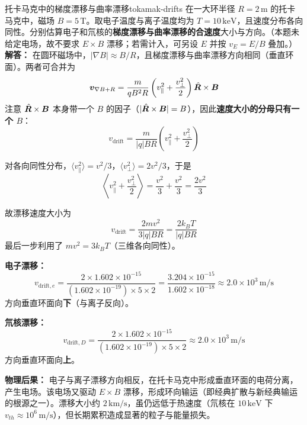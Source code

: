 \begin{example}{托卡马克中的梯度漂移与曲率漂移}{tokamak-drifts}
在一大环半径 $R=2\,\mathrm{m}$ 的托卡马克中，磁场 $B=5\,\mathrm{T}$。取电子温度与离子温度均为 $T=10\,\mathrm{keV}$，且速度分布各向同性。分别估算电子和氘核的\textbf{梯度漂移与曲率漂移的合速度}大小与方向。（本题未给定电场，故不要求 $E\times B$ 漂移；若需计入，可另设 $E$ 并按 $v_E=E/B$ 叠加。）
\tcblower
\textbf{解答：}
在圆环磁场中，$|\nabla B|\approx B/R$，且梯度漂移与曲率漂移方向相同（垂直环面）。两者可合并为
\[
\bm{v}_{\nabla B+R} = \frac{m}{qB^{2}R}\left(v_{\parallel}^2 + \frac{v_{\perp}^2}{2}\right)\hat{\bm{R}}\times\bm{B}
\]
注意 $\hat{\bm{R}}\times\bm{B}$ 本身带一个 $B$ 的因子（$|\hat{\bm{R}}\times\bm{B}|=B$），因此\textbf{速度大小的分母只有一个 $B$}：
\[
v_{\text{drift}} = \frac{m}{|q|BR}\left(v_{\parallel}^2 + \frac{v_{\perp}^2}{2}\right)
\]

对各向同性分布，$\langle v_{\parallel}^2\rangle = v^2/3$，$\langle v_{\perp}^2\rangle = 2v^2/3$，于是
\[
\left\langle v_{\parallel}^2 + \frac{v_{\perp}^2}{2}\right\rangle = \frac{v^2}{3} + \frac{v^2}{3} = \frac{2v^2}{3}
\]

故漂移速度大小为
\[
v_{\text{drift}} = \frac{2mv^2}{3|q|BR} = \frac{2k_{\!B}T}{|q|BR}
\]
最后一步利用了 $mv^2 = 3k_{\!B}T$（三维各向同性）。

\textbf{电子漂移：}
\[
v_{\text{drift},e} = \frac{2\times 1.602\times 10^{-15}}{(1.602\times 10^{-19})\times 5\times 2} = \frac{3.204\times 10^{-15}}{1.602\times 10^{-18}} \approx 2.0\times 10^{3}\,\mathrm{m/s}
\]
方向垂直环面向\textbf{下}（与离子反向）。

\textbf{氘核漂移：}
\[
v_{\text{drift},D} = \frac{2\times 1.602\times 10^{-15}}{(1.602\times 10^{-19})\times 5\times 2} \approx 2.0\times 10^{3}\,\mathrm{m/s}
\]
方向垂直环面向\textbf{上}。

\textbf{物理后果：} 电子与离子漂移方向相反，在托卡马克中形成垂直环面的电荷分离，产生电场。该电场又驱动 $E\times B$ 漂移，形成环向输运（即经典扩散与新经典输运的根源之一）。漂移大小约 $2\,\mathrm{km/s}$，虽仍远低于热速度（氘核在 $10\,\mathrm{keV}$ 下 $v_{th}\approx 10^{6}\,\mathrm{m/s}$），但长期累积造成显著的粒子与能量损失。
\end{example}

